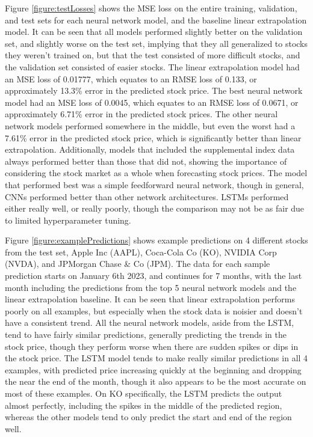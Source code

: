 \documentclass[conference]{IEEEtran}
\begin{document}
Figure \ref{figure:testLosses} shows the MSE loss on the entire training, validation, and test sets for each neural network model, and the baseline linear extrapolation model. It can be seen that all models performed slightly better on the validation set, and slightly worse on the test set, implying that they all generalized to stocks they weren't trained on, but that the test consisted of more difficult stocks, and the validation set consisted of easier stocks. The linear extrapolation model had an MSE loss of 0.01777, which equates to an RMSE loss of 0.133, or approximately 13.3\% error in the predicted stock price. The best neural network model had an MSE loss of 0.0045, which equates to an RMSE loss of 0.0671, or approximately 6.71\% error in the predicted stock prices. The other neural network models performed somewhere in the middle, but even the worst had a 7.61\% error in the predicted stock price, which is significantly better than linear extrapolation. Additionally, models that included the supplemental index data always performed better than those that did not, showing the importance of considering the stock market as a whole when forecasting stock prices. The model that performed best was a simple feedforward neural network, though in general, CNNs performed better than other network architectures. LSTMs performed either really well, or really poorly, though the comparison may not be as fair due to limited hyperparameter tuning.

Figure \ref{figure:examplePredictions} shows example predictions on 4 different stocks from the test set, Apple Inc (AAPL), Coca-Cola Co (KO), NVIDIA Corp (NVDA), and JPMorgan Chase \& Co (JPM). The data for each sample prediction starts on January 6th 2023, and continues for 7 months, with the last month including the predictions from the top 5 neural network models and the linear extrapolation baseline. It can be seen that linear extrapolation performs poorly on all examples, but especially when the stock data is noisier and doesn't have a consistent trend. All the neural network models, aside from the LSTM, tend to have fairly similar predictions, generally predicting the trends in the stock price, though they perform worse when there are sudden spikes or dips in the stock price. The LSTM model tends to make really similar predictions in all 4 examples, with predicted price increasing quickly at the beginning and dropping the near the end of the month, though it also appears to be the most accurate on most of these examples. On KO specifically, the LSTM predicts the output almost perfectly, including the spikes in the middle of the predicted region, whereas the other models tend to only predict the start and end of the region well.
\end{document}
